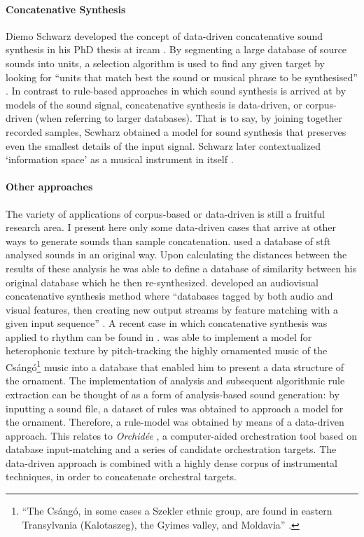 \documentclass[
]{book}
\begin{document}
\paragraph{Concatenative Synthesis}
Diemo Schwarz developed the concept of data-driven concatenative sound synthesis in his PhD thesis at \gls{ircam} \parencites{Schwarz2000}{icmc/bbp2372.2003.099}{Sch06:How}. By segmenting a large database of source sounds into units, a selection algorithm is used to find any given target by looking for ``units that match best the sound or musical phrase to be synthesised'' \parencite{Sch06:How}. In contrast to rule-based approaches in which sound synthesis is arrived at by models of the sound signal, concatenative synthesis is data-driven, or corpus-driven (when referring to larger databases). That is to say, by joining together recorded samples, Scwharz obtained a model for sound synthesis that preserves even the smallest details of the input signal. Schwarz later contextualized `information space' as a musical instrument in itself \parencites{diemo_schwarz_2009_849679}{Schwarz:2012}.

\paragraph{Other approaches}
The variety of applications of corpus-based or data-driven is still a fruitful research area. I present here only some data-driven cases that arrive at other ways to generate sounds than sample concatenation. \textcite{icmc/bbp2372.2003.052} used a database of \gls{stft} analysed sounds in an original way. Upon calculating the distances between the results of these analysis he was able to define a database of similarity between his original database which he then re-synthesized. \textcite{DBLP:conf/icmc/Collins07} developed an audiovisual concatenative synthesis method where ``databases tagged by both audio and visual features, then creating new output streams by feature matching with a given input sequence'' \parencite[1]{DBLP:conf/icmc/Collins07}. A recent case in which concatenative synthesis was applied to rhythm can be found in \textcite{Nuannicode225in2016}. \textcite{icmc/bbp2372.2003.030} was able to implement a model for heterophonic texture by pitch-tracking the highly ornamented music of the Csángó\footnote{``The Csángó, in some cases a Szekler ethnic group, are found in eastern Transylvania (Kalotaszeg), the Gyimes valley, and Moldavia'' \parencite{icmc/bbp2372.2003.030}.} music into a database that enabled him to present a data structure of the ornament. The implementation of analysis and subsequent algorithmic rule extraction can be thought of as a form of analysis-based sound generation: by inputting a sound file, a dataset of rules was obtained to approach a model for the ornament. Therefore, a rule-model was obtained by means of a data-driven approach.	This relates to \textit{Orchidée} \parencite{gregoire_carpentier_2006_849343}, a computer-aided orchestration tool based on database input-matching and a series of candidate orchestration targets. The data-driven approach is combined with a highly dense corpus of instrumental techniques, in order to concatenate orchestral targets.
\end{document}
